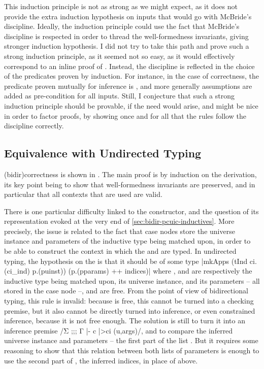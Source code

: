 This induction principle is not as strong as we might expect, as it does not provide the extra induction hypothesis on inputs that would go with McBride's discipline.
Ideally, the induction principle could use the fact that McBride’s discipline is
respected in order to thread the well-formedness invariants, giving stronger induction
hypothesis. I did not try to take this path and prove such a strong induction principle,
as it seemed not so easy, as it would effectively correspond to an inline proof
of .
Instead, the discipline is reflected in the choice of the predicates proven by induction.
For instance, in the case of correctness, the predicate proven mutually for inference
is , and more generally
assumptions are added as pre-condition for all inputs.
Still, I conjecture that such a strong induction principle should be provable, if the need
would arise, and might be nice in order to factor proofs, by showing once and for all that
the rules follow the discipline correctly.

\subsection{Equivalence with Undirected Typing}

\kl(bidir){correctness}%
is shown in .
The main proof is by induction on the derivation,
its key point being to show that well-formedness invariants are preserved, and in particular
that all contexts that are used are valid.

There is one particular difficulty linked to the  constructor, and the question
of its representation evoked at the very end of \cref{sec:bidir-pcuic-inductives}.
More precisely, the issue is related to the fact that case nodes store the universe
instance and parameters of the inductive type being matched upon, in order to be able to
construct the context in which the  and  are typed.
In undirected typing, the hypothesis on the  is that it should be of some type
\coqline|mkApps (tInd ci.(ci_ind) p.(puinst)) (p.(pparams) ++ indices)|
where ,  and 
are respectively the inductive type being matched upon, its universe instance, and its
parameters – all stored in the case node –, and 
are free. From the point of view of bidirectional typing, this rule is invalid:%
%
because  is free, this cannot be turned into a checking premise, but it also
cannot be directly turned into inference, or even constrained inference, because it is
not free enough.
The solution is still to turn it into an inference premise
\coqe/Σ ;;; Γ |- c |>{ci} (u,args)/, and to compare the inferred universe instance 
and parameters – the first part of the list . But it requires some reasoning to
show that this relation between both lists of parameters is enough to use the second part
of , the inferred indices, in place of  above.

